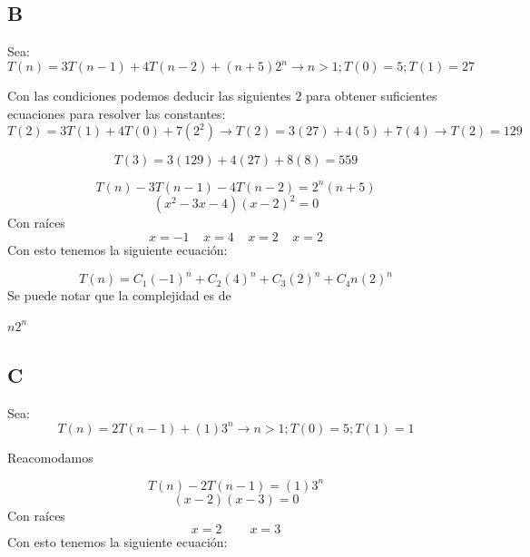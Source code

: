 \documentclass[12pt, fleqn]{article}                             %
\theoremstyle{break}                                            %
\begin{document}
    \subsection{B}
    Sea:
    \begin{equation*}
        T(n)=3T(n-1)+4T(n-2)+(n+5)2^n \rightarrow n>1; T(0)=5; T(1)=27
    \end{equation*}

    Con las condiciones podemos deducir las siguientes 2 para obtener suficientes ecuaciones para resolver las constantes:
    \begin{equation*}
        T(2)=3T(1)+4T(0)+7(2^2) \rightarrow T(2)=3(27)+4(5)+7(4) \rightarrow T(2)=129
    \end{equation*}

    \begin{equation*}
        T(3)=3(129)+4(27)+8(8)=559
   \end{equation*}

    \begin{equation*}
        T(n)-3T(n-1)-4T(n-2)=2^n(n+5)
    \end{equation*}
        \begin{equation*}
        (x^2-3x-4)(x-2)^2=0
    \end{equation*}
    Con raíces
        \begin{equation*}
        x=-1\:\:\:\:\: x=4 \:\:\:\:\: x=2 \:\:\:\:\: x=2
    \end{equation*}
    Con esto tenemos la siguiente ecuación:

    \begin{equation*}
        T(n)=C_1(-1)^n+C_2(4)^n+C_3(2)^n+C_4n(2)^n
    \end{equation*}
    Se puede notar que la complejidad es de 

    $n2^n$
    \subsection{C}
    Sea:
    \begin{equation*}
        T(n)=2T(n-1)+(1)3^n \rightarrow n>1; T(0)=5; T(1)=1
    \end{equation*}

    Reacomodamos

    \begin{equation*}
        T(n)-2T(n-1)=(1)3^n
    \end{equation*}
        \begin{equation*}
        (x-2)(x-3)=0
    \end{equation*}
    Con raíces
        \begin{equation*}
        x=2\:\:\:\:\:\:\:\:\:\: x=3 
    \end{equation*}
    Con esto tenemos la siguiente ecuación:
\end{document}
